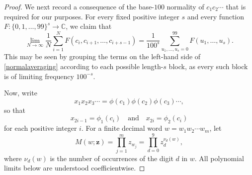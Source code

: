 \documentclass[10pt,a4paper]{amsart}
\begin{document}
\begin{proof}
 We next record a consequence of the base-$100$ normality of
$c_1c_2\cdots$ that is required for our purposes. For every fixed positive
integer $s$ and every function
$F\colon\{0,1,\ldots,99\}^{s}\longrightarrow\mathbb C$, we claim that 
\begin{equation}\label{normalaveraging}
 \lim_{N\to\infty}\frac{1}{N}
 \sum_{i=1}^{N}F(c_i,c_{i+1},\ldots,c_{i+s-1}) =\frac{1}{100^{s}}
 \sum_{u_1,\ldots,u_s=0}^{99}F(u_1,\ldots,u_s). 
\end{equation} 
 This may be seen by grouping the terms on the left-hand side 
 of \eqref{normalaveraging}
 according to each possible
length-$s$ block, as every such block is of limiting frequency $100^{-s}$. 
 
 Now, write $$  x_1 x_2 x_3 \cdots=\phi(c_1)\phi(c_2)\phi(c_3)\cdots, $$ so that
\begin{equation}\label{xcoordinates}
 x_{2i-1}=\phi_1(c_i)
 \quad\text{and}\quad
 x_{2i}=\phi_2(c_i) 
\end{equation} 
 for each positive integer $i$. 
For a finite decimal word $w=w_1w_2\cdots w_m$, let
\begin{equation}\label{defineM}
 M(w;\mathbf z)
 =\prod_{j=1}^{m}z_{w_j}
 =\prod_{d=0}^{9}z_d^{\nu_d(w)},
\end{equation}
where $\nu_d(w)$ is the number of occurrences of the digit $d$ in $w$.
All polynomial limits below are understood coefficientwise.


\end{proof}
\end{document}
